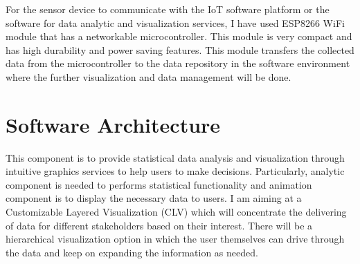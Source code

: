 \documentclass[11pt]{article}
\begin{document}
    For the sensor device to communicate with the IoT software platform  or the software for data analytic and visualization services, I have used ESP8266 WiFi module that has a networkable microcontroller. This module is very compact and has high durability and power saving features. This module transfers the collected data from the microcontroller to the data repository in the software environment where the further visualization and data management will be done.
    

      
 \section*{Software Architecture}
 
 This component is to provide statistical data analysis and visualization through intuitive graphics services to help users to make decisions. Particularly, analytic component is needed to performs statistical functionality and animation component is to display the necessary data to users. I am aiming at a Customizable Layered Visualization (CLV) which will concentrate the delivering of data for different stakeholders based on their interest. There will be a hierarchical visualization option in which the user themselves can drive through the data and keep on expanding the information as needed.


    


\end{document}
